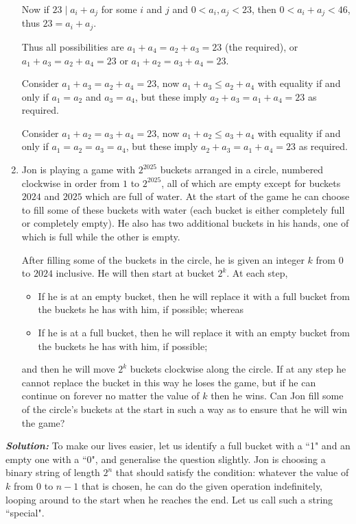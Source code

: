\documentclass[11pt]{article}
\newcommand{\sol}{\textbf{\textit{Solution: }}}
\begin{document}
\begin{enumerate}[topsep=\bigskipamount,itemsep=\bigskipamount,leftmargin=0pt]
Now if $23 \mid a_i+a_j$ for some $i$ and $j$ and $0< a_i,a_j < 23$, then $0< a_i+a_j<46$, thus $23 = a_i+a_j$.

Thus all possibilities are $a_1+a_4 = a_2+a_3 = 23$ (the required), or $a_1+a_3 = a_2+a_4 = 23$ or $a_1+a_2 = a_3+a_4 = 23$.

Consider $a_1+a_3=a_2+a_4=23$,
now $a_1+a_3\leq a_2+a_4$ with equality if and only if $a_1=a_2$ and $a_3=a_4$,
but these imply $a_2+a_3=a_1+a_4=23$ as required.

Consider $a_1+a_2=a_3+a_4=23$,
now $a_1+a_2\leq a_3+a_4$ with equality if and only if $a_1=a_2=a_3=a_4$,
but these imply $a_2+a_3=a_1+a_4=23$ as required.
\item 
Jon is playing a game with $2^{2025}$ buckets arranged in a circle, numbered clockwise in order from $1$ to $2^{2025}$, all of which are empty except for buckets $2024$ and $2025$ which are full of water.
At the start of the game he can choose to fill some of these buckets with water (each bucket is either completely full or completely empty).
He also has two additional buckets in his hands, one of which is full while the other is empty.

After filling some of the buckets in the circle, he is given an integer $k$ from $0$ to $2024$ inclusive. He will then start at bucket $2^k$. At each step,
\begin{itemize}
\item If he is at an empty bucket, then he will replace it with a full bucket from the buckets he has with him, if possible; whereas
\item If he is at a full bucket, then he will replace it with an empty bucket from the buckets he has with him, if possible;
\end{itemize}
and then he will move $2^k$ buckets clockwise along the circle.
If at any step he cannot replace the bucket in this way he loses the game, but if he can continue on forever no matter the value of $k$ then he wins.
Can Jon fill some of the circle's buckets at the start in such a way as to ensure that he will win the game?
\end{enumerate}

\sol %
To make our lives easier, let us identify a full bucket with a ``1" and an empty one with a ``0", and generalise the question slightly. Jon is choosing a binary string of length $2^n$ that should satisfy the condition: whatever the value of $k$ from 0 to $n-1$ that is chosen, he can do the given operation indefinitely, looping around to the start when he reaches the end. Let us call such a string ``special".
\end{document}
